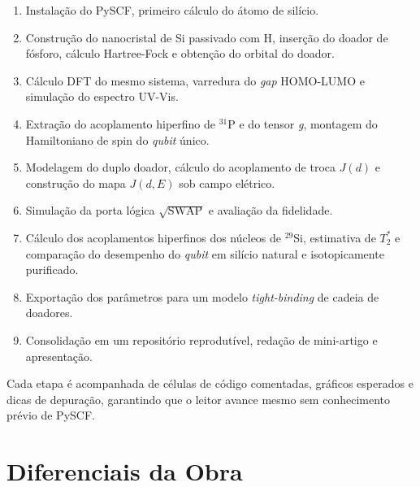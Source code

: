 \documentclass[12pt,a4paper]{article}
\begin{document}
	\begin{enumerate}[label=\textbf{Etapa \arabic*:},leftmargin=*]
		\item Instalação do PySCF, primeiro cálculo do átomo de silício.
		\item Construção do nanocristal de Si passivado com H, inserção do doador de fósforo, cálculo Hartree-Fock e obtenção do orbital do doador.
		\item Cálculo DFT do mesmo sistema, varredura do \emph{gap} HOMO-LUMO e simulação do espectro UV-Vis.
		\item Extração do acoplamento hiperfino de $^{31}$P e do tensor \emph{g}, montagem do Hamiltoniano de spin do \emph{qubit} único.
		\item Modelagem do duplo doador, cálculo do acoplamento de troca $J(d)$ e construção do mapa $J(d, E)$ sob campo elétrico.
		\item Simulação da porta lógica $\sqrt{\text{SWAP}}$ e avaliação da fidelidade.
		\item Cálculo dos acoplamentos hiperfinos dos núcleos de $^{29}$Si, estimativa de $T_2^*$ e comparação do desempenho do \emph{qubit} em silício natural e isotopicamente purificado.
		\item Exportação dos parâmetros para um modelo \emph{tight-binding} de cadeia de doadores.
		\item Consolidação em um repositório reprodutível, redação de mini-artigo e apresentação.
	\end{enumerate}
	
	Cada etapa é acompanhada de células de código comentadas, gráficos esperados e dicas de depuração, garantindo que o leitor avance mesmo sem conhecimento prévio de PySCF.
	
	\section{Diferenciais da Obra}
	
\end{document}
